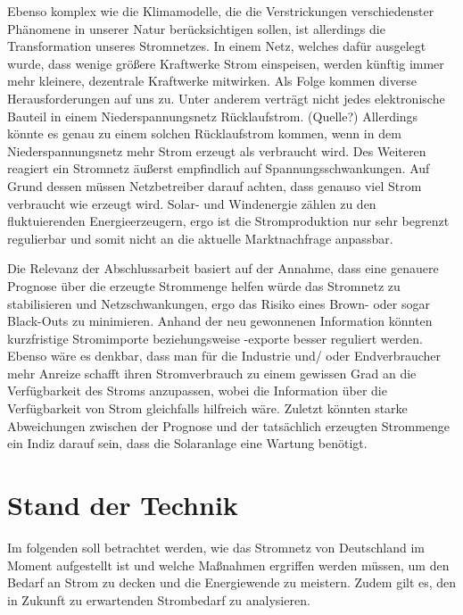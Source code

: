 \documentclass[12pt, a4paper]{article}
\begin{document}
Ebenso komplex wie die Klimamodelle, die die Verstrickungen verschiedenster Phänomene in unserer Natur berücksichtigen sollen, ist allerdings die Transformation unseres Stromnetzes. In einem Netz, welches dafür ausgelegt wurde, dass wenige größere Kraftwerke Strom einspeisen, werden künftig immer mehr kleinere, dezentrale Kraftwerke mitwirken. Als Folge kommen diverse Herausforderungen auf uns zu. Unter anderem verträgt nicht jedes elektronische Bauteil in einem Niederspannungsnetz Rücklaufstrom. (Quelle?) Allerdings könnte es genau zu einem solchen Rücklaufstrom kommen, wenn in dem Niederspannungsnetz mehr Strom erzeugt als verbraucht wird. Des Weiteren reagiert ein Stromnetz äußerst empfindlich auf Spannungsschwankungen. Auf Grund dessen müssen Netzbetreiber darauf achten, dass genauso viel Strom verbraucht wie erzeugt wird. Solar- und Windenergie zählen zu den fluktuierenden Energieerzeugern, ergo ist die Stromproduktion nur sehr begrenzt regulierbar und somit nicht an die aktuelle Marktnachfrage anpassbar.

Die Relevanz der Abschlussarbeit basiert auf der Annahme, dass eine genauere Prognose über die erzeugte Strommenge helfen würde das Stromnetz zu stabilisieren und Netzschwankungen, ergo das Risiko eines Brown- oder sogar Black-Outs zu minimieren. Anhand der neu gewonnenen
Information könnten kurzfristige Stromimporte beziehungsweise -exporte besser reguliert werden. Ebenso wäre es denkbar, dass man für die Industrie und/ oder Endverbraucher mehr Anreize schafft ihren Stromverbrauch zu einem gewissen Grad an die Verfügbarkeit des Stroms
anzupassen, wobei die Information über die Verfügbarkeit von Strom gleichfalls hilfreich wäre. Zuletzt könnten starke Abweichungen zwischen der Prognose und der tatsächlich erzeugten Strommenge ein Indiz darauf sein, dass die Solaranlage eine Wartung benötigt.


\newpage

\section{Stand der Technik}

Im folgenden soll betrachtet werden, wie das Stromnetz von Deutschland im Moment aufgestellt ist und welche Maßnahmen ergriffen werden müssen, um den Bedarf an Strom zu decken und die Energiewende zu meistern. Zudem gilt es, den in Zukunft zu erwartenden Strombedarf zu analysieren.
\end{document}
